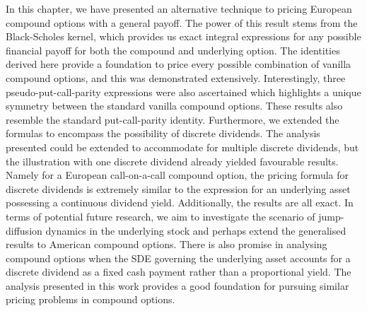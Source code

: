 In this chapter, we have presented an alternative technique to pricing European compound options with a general payoff. The power of this result stems from the Black-Scholes kernel, which provides us exact integral expressions for any possible financial payoff for both the compound and underlying option. The identities derived here provide a foundation to price every possible combination of vanilla compound options, and this was demonstrated extensively. Interestingly, three pseudo-put-call-parity expressions were also ascertained which highlights a unique symmetry between the standard vanilla compound options. These results also resemble the standard put-call-parity identity. Furthermore, we extended the formulas to encompass the possibility of discrete dividends. The analysis presented could be extended to accommodate for multiple discrete dividends, but the illustration with one discrete dividend already yielded favourable results. Namely for a European call-on-a-call compound option, the pricing formula for discrete dividends is extremely similar to the expression for an underlying asset possessing a continuous dividend yield. Additionally, the results are all exact. In terms of potential future research, we aim to investigate the scenario of jump-diffusion dynamics in the underlying stock and perhaps extend the generalised results to American compound options. There is also promise in analysing compound options when the SDE governing the underlying asset accounts for a discrete dividend as a fixed cash payment rather than a proportional yield. The analysis presented in this work provides a good foundation for pursuing similar pricing problems in compound options.
